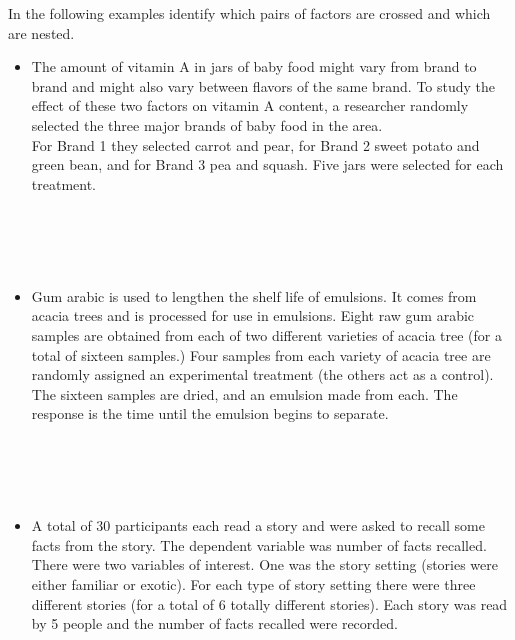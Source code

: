 \newpage

In the following examples identify which pairs of factors are crossed and which are nested.
\begin{itemize}
\item The amount of vitamin A in jars of baby food might vary from brand to brand and might also vary between flavors of the same brand. To study the effect of these two factors on vitamin A content, a researcher randomly selected the three major brands of baby food in the area.\\
For Brand 1 they selected carrot and pear, for Brand 2 sweet potato and green bean, and for Brand 3 pea and squash.   Five jars were selected for each treatment.\\~\\~\\~\\~\\

\item Gum arabic is used to lengthen the shelf life of emulsions. It comes from acacia trees and is processed for use in emulsions. Eight raw gum arabic samples are obtained from each of two different varieties of acacia tree (for a total of sixteen samples.)  Four samples from each variety of acacia tree are randomly assigned an experimental treatment (the others act as a control).  The sixteen samples are dried, and an emulsion made from each. The response is the time until the emulsion begins to separate.\\~\\~\\~\\~\\
\item A total of 30 participants each read a story and were asked to recall some facts from the story. The dependent variable was number of facts recalled. There were two variables of interest.  One was the story setting (stories were either familiar or exotic).  For each type of story setting there were three different stories (for a total of 6 totally different stories).  Each story was read by 5 people and the number of facts recalled were recorded.\\~\\
\end{itemize}

\newpage


